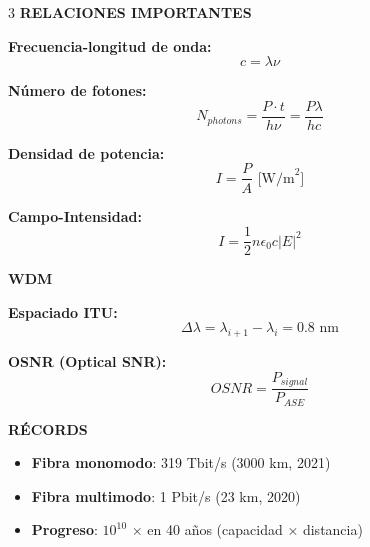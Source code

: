 \documentclass[10pt,a4paper,landscape]{article}
\newcommand{\secbox}[1]{\colorbox{blue!20}{\textbf{#1}}}
\begin{document}
\begin{multicols}{3}
\secbox{RELACIONES IMPORTANTES}

\textbf{Frecuencia-longitud de onda:}
\begin{equation*}
\boxed{c = \lambda \nu}
\end{equation*}

\textbf{Número de fotones:}
\begin{equation*}
\boxed{N_{photons} = \frac{P \cdot t}{h\nu} = \frac{P \lambda}{hc}}
\end{equation*}

\textbf{Densidad de potencia:}
\begin{equation*}
\boxed{I = \frac{P}{A} \text{ [W/m}^2\text{]}}
\end{equation*}

\textbf{Campo-Intensidad:}
\begin{equation*}
\boxed{I = \frac{1}{2}n\epsilon_0 c |E|^2}
\end{equation*}

\secbox{WDM}

\textbf{Espaciado ITU:}
\begin{equation*}
\boxed{\Delta\lambda = \lambda_{i+1} - \lambda_i = 0.8 \text{ nm}}
\end{equation*}

\textbf{OSNR (Optical SNR):}
\begin{equation*}
\boxed{OSNR = \frac{P_{signal}}{P_{ASE}}}
\end{equation*}

\secbox{RÉCORDS}

\begin{itemize}
\item \textbf{Fibra monomodo}: 319 Tbit/s (3000 km, 2021)
\item \textbf{Fibra multimodo}: 1 Pbit/s (23 km, 2020)
\item \textbf{Progreso}: $10^{10}$ × en 40 años (capacidad × distancia)
\end{itemize}

\end{multicols}
\end{document}
